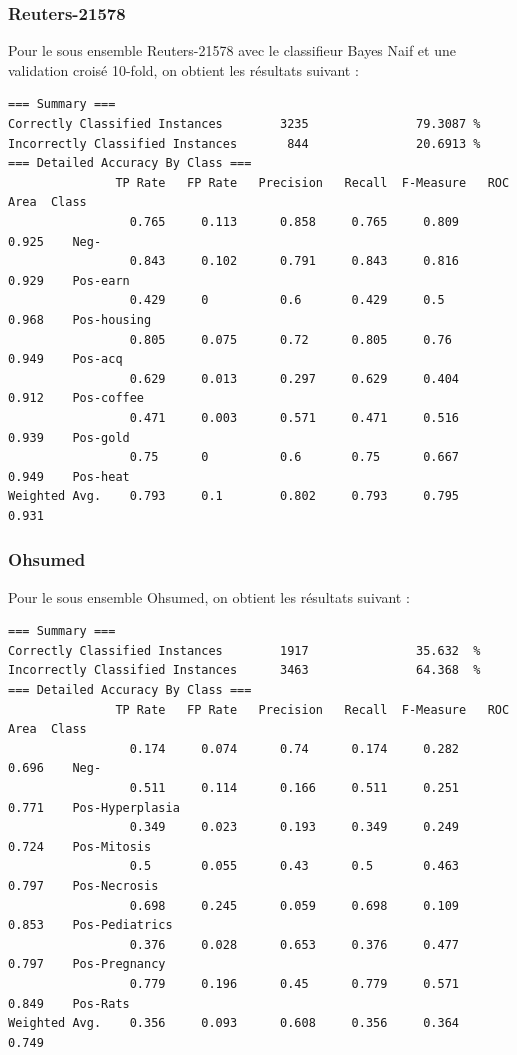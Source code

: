 \documentclass[a4paper,10pt]{article}
\begin{document}
\subsubsection{Reuters-21578}
Pour le sous ensemble Reuters-21578 avec le classifieur Bayes Naif et une validation croisé 10-fold, on obtient les résultats suivant :
\begin{verbatim}
=== Summary ===
Correctly Classified Instances        3235               79.3087 %
Incorrectly Classified Instances       844               20.6913 %     
=== Detailed Accuracy By Class ===
               TP Rate   FP Rate   Precision   Recall  F-Measure   ROC Area  Class
                 0.765     0.113      0.858     0.765     0.809      0.925    Neg-
                 0.843     0.102      0.791     0.843     0.816      0.929    Pos-earn
                 0.429     0          0.6       0.429     0.5        0.968    Pos-housing
                 0.805     0.075      0.72      0.805     0.76       0.949    Pos-acq
                 0.629     0.013      0.297     0.629     0.404      0.912    Pos-coffee
                 0.471     0.003      0.571     0.471     0.516      0.939    Pos-gold
                 0.75      0          0.6       0.75      0.667      0.949    Pos-heat
Weighted Avg.    0.793     0.1        0.802     0.793     0.795      0.931
\end{verbatim}

\subsubsection{Ohsumed}
Pour le sous ensemble Ohsumed, on obtient les résultats suivant :
\begin{verbatim}
=== Summary ===
Correctly Classified Instances        1917               35.632  %
Incorrectly Classified Instances      3463               64.368  %    
=== Detailed Accuracy By Class ===
               TP Rate   FP Rate   Precision   Recall  F-Measure   ROC Area  Class
                 0.174     0.074      0.74      0.174     0.282      0.696    Neg-
                 0.511     0.114      0.166     0.511     0.251      0.771    Pos-Hyperplasia
                 0.349     0.023      0.193     0.349     0.249      0.724    Pos-Mitosis
                 0.5       0.055      0.43      0.5       0.463      0.797    Pos-Necrosis
                 0.698     0.245      0.059     0.698     0.109      0.853    Pos-Pediatrics
                 0.376     0.028      0.653     0.376     0.477      0.797    Pos-Pregnancy
                 0.779     0.196      0.45      0.779     0.571      0.849    Pos-Rats
Weighted Avg.    0.356     0.093      0.608     0.356     0.364      0.749
\end{verbatim}
\end{document}
